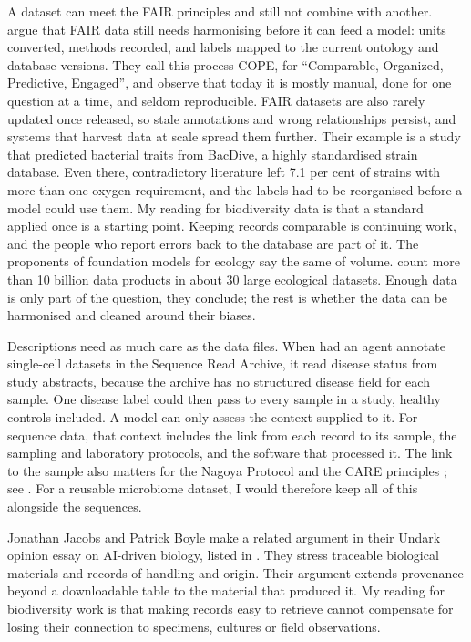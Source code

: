 A dataset can meet the FAIR principles and still not combine with another.
\textcite{woodcharlson2026cope} argue that FAIR data still needs harmonising
before it can feed a model: units converted, methods recorded, and labels mapped
to the current ontology and database versions. They call this process COPE,
for ``Comparable, Organized, Predictive, Engaged'', and observe that today it
is mostly manual, done for one question at a time, and seldom reproducible.
FAIR datasets are also rarely updated once released, so stale annotations and
wrong relationships persist, and systems that harvest data at scale spread
them further. Their example is a study that predicted bacterial traits from
BacDive, a highly standardised strain database. Even there, contradictory
literature left 7.1 per cent of strains with more than one oxygen requirement,
and the labels had to be reorganised before a model could use them. My reading for
biodiversity data is that a standard applied once is a starting point. Keeping
records comparable is continuing work, and the people who report errors back
to the database are part of it. The proponents of foundation models for
ecology say the same of volume. \textcite{gardiner2026foundation} count more
than 10 billion data products in about 30 large ecological datasets. Enough
data is only part of the question, they conclude; the rest is whether the
data can be harmonised and cleaned around their biases.

Descriptions need as much care as the data files. When
\textcite{youngblut2026scbasecount} had an agent annotate single-cell datasets
in the Sequence Read Archive, it read disease status from study abstracts,
because the archive has no structured disease field for each sample. One
disease label could then pass to every sample in a study, healthy controls
included. A model can only assess the context supplied to it. For sequence
data, that context includes the link from each record to its sample, the
sampling and laboratory protocols, and the software that processed it. The
link to the sample also matters for the Nagoya Protocol and the CARE
principles \parencite{woodcharlson2026cope}; see . For a reusable
microbiome dataset, I would therefore keep all of this alongside the sequences.

Jonathan Jacobs and Patrick Boyle make a related argument in their Undark
opinion essay on AI-driven biology, listed in . They stress
traceable biological materials and records of handling and origin. Their
argument extends provenance beyond a downloadable table to the material that
produced it. My reading for biodiversity work is that making records easy to
retrieve cannot compensate for losing their connection to specimens, cultures
or field observations.

